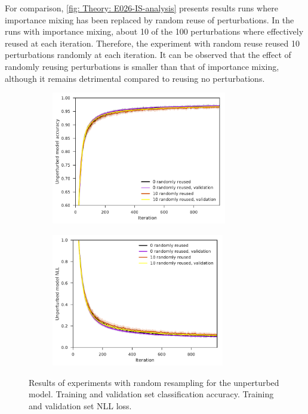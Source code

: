 For comparison, \autoref{fig: Theory: E026-IS-analysis} presents results runs where importance mixing has been replaced by random reuse of perturbations. In the runs with importance mixing, about 10 of the 100 perturbations where effectively reused at each iteration. Therefore, the experiment with random reuse reused 10 perturbations randomly at each iteration. It can be observed that the effect of randomly reusing perturbations is smaller than that of importance mixing, although it remains detrimental compared to reusing no perturbations.

\begin{figure}[tbp!]
    \begin{subfigure}[b]{0.49\textwidth}
        \centering
        \includegraphics[height=5.8cm]{graphics/E026-IS-analysis/accuracy_unp-all-series-mean-sd.pdf}
        \caption{}
        \label{fig: Theory: E026-IS-analysis/accuracy_unp-all-series-mean-sd}
    \end{subfigure}
    \hfill
    \begin{subfigure}[b]{0.49\textwidth}
        \centering
        \includegraphics[height=5.8cm]{graphics/E026-IS-analysis/return_unp-all-series-mean-sd.pdf}
        \caption{}
        \label{fig: Theory: E026-IS-analysis/return_unp-all-series-mean-sd}
    \end{subfigure}
    \caption{
        Results of experiments with random resampling for the unperturbed model.
         Training and validation set classification accuracy.
         Training and validation set \gls{NLL} loss.
    }
    \label{fig: Theory: E026-IS-analysis}
\end{figure}

